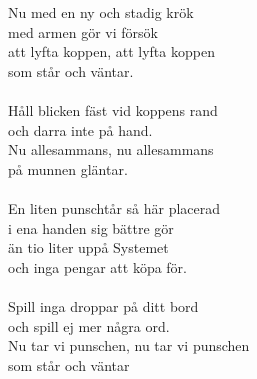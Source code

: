 {\footnotesize{}}\\
\\
Nu med en ny och stadig krök\\
med armen gör vi försök\\
att lyfta koppen, att lyfta koppen\\
som står och väntar.\\
\\
Håll blicken fäst vid koppens rand \\
och darra inte på hand.\\
Nu allesammans, nu allesammans\\
på munnen gläntar.\\
\\
En liten punschtår så här placerad\\
i ena handen sig bättre gör\\
än tio liter uppå Systemet\\
och inga pengar att köpa för.\\
\\
Spill inga droppar på ditt bord\\
och spill ej mer några ord.\\
Nu tar vi punschen, nu tar vi punschen\\
som står och väntar
